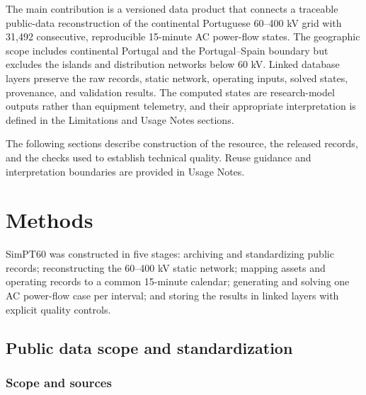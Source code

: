 \documentclass[
  10pt]{article}
\begin{document}
The main contribution is a versioned data product that connects a
traceable public-data reconstruction of the continental Portuguese
60--400 kV grid with 31,492 consecutive, reproducible 15-minute AC
power-flow states. The geographic scope includes continental Portugal
and the Portugal--Spain boundary but excludes the islands and
distribution networks below 60 kV. Linked database layers preserve the
raw records, static network, operating inputs, solved states,
provenance, and validation results. The computed states are
research-model outputs rather than equipment telemetry, and their
appropriate interpretation is defined in the Limitations and Usage Notes
sections.

The following sections describe construction of the resource, the
released records, and the checks used to establish technical quality.
Reuse guidance and interpretation boundaries are provided in Usage
Notes.

\section{Methods}\label{methods}

SimPT60 was constructed in five stages: archiving and standardizing
public records; reconstructing the 60--400 kV static network; mapping
assets and operating records to a common 15-minute calendar; generating
and solving one AC power-flow case per interval; and storing the results
in linked layers with explicit quality controls.

\subsection{Public data scope and
standardization}\label{public-data-scope-and-standardization}

\subsubsection{Scope and sources}\label{scope-and-sources}
\end{document}

